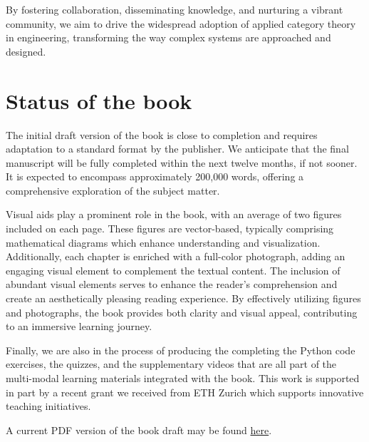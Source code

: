 \documentclass[10pt, article, one side]{memoir}
\begin{document}
    By fostering collaboration, disseminating knowledge, and nurturing a vibrant community, we aim to drive the widespread adoption of applied category theory in engineering, transforming the way complex systems are approached and designed.

    \section{Status of the book}
    The initial draft version of the book is close to completion and requires adaptation to a standard format by the publisher. We anticipate that the final manuscript will be fully completed within the next twelve months, if not sooner. It is expected to encompass approximately 200,000 words, offering a comprehensive exploration of the subject matter. 
    
    Visual aids play a prominent role in the book, with an average of two figures included on each page. These figures are vector-based, typically comprising mathematical diagrams which enhance understanding and visualization.
    Additionally, each chapter is enriched with a full-color photograph, adding an engaging visual element to complement the textual content. The inclusion of abundant visual elements serves to enhance the reader's comprehension and create an aesthetically pleasing reading experience.
    By effectively utilizing figures and photographs, the book provides both clarity and visual appeal, contributing to an immersive learning journey.
    
    Finally, we are also in the process of producing the completing the Python code exercises, the quizzes, and the supplementary videos that are all part of the multi-modal learning materials integrated with the book. This work is supported in part by a recent grant we received from ETH Zurich which supports innovative teaching initiatives. 
        
    A current PDF version of the book draft may be found \href{https://z7-stage-act4e-book.zuper.ai/sync/ACT4E/ACT4E/alphubel-prod/build/last/build-public/ACT4E-public.pdf}{here}.
\end{document}
